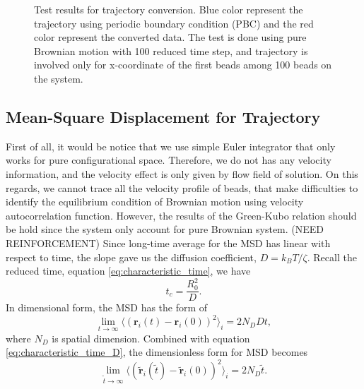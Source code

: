 \documentclass[10pt, a4paper]{article}
\begin{document}
\begin{appendices}
\begin{figure}
\caption{Test results for trajectory conversion. Blue color represent the trajectory using periodic boundary condition (PBC) and the red color represent the converted data. The test is done using pure Brownian motion with 100 reduced time step, and trajectory is involved only for x-coordinate of the first beads among 100 beads on the system.}
\label{fig:traj_conv}
\end{figure}

\subsection{Mean-Square Displacement for Trajectory}
First of all, it would be notice that we use simple Euler integrator that only works for pure configurational space. Therefore, we do not has any velocity information, and the velocity effect is only given by flow field of solution. On this regards, we cannot trace all the velocity profile of beads, that make difficulties to identify the equilibrium condition of Brownian motion using velocity autocorrelation function. However, the results of the Green-Kubo relation should be hold since the system only account for pure Brownian system. (NEED REINFORCEMENT) Since long-time average for the MSD has linear with respect to time, the slope gave us the diffusion coefficient, $D = k_BT/\zeta$. Recall the reduced time, equation \eqref{eq:characteristic_time}, we have
\begin{equation}
t_c = \frac{R_0^2}{D}.\label{eq:characteristic_time_D}
\end{equation}
In dimensional form, the MSD has the form of
\begin{equation}
\lim_{t\to\infty}\langle \left(\mathbf{r}_i(t)- \mathbf{r}_i(0)\right)^2\rangle_i = 2N_D Dt,
\end{equation}
where $N_D$ is spatial dimension.
Combined with equation \eqref{eq:characteristic_time_D}, the dimensionless form for MSD becomes
\begin{equation}
\lim_{\tilde{t}\to\infty}\langle \left(\tilde{\mathbf{r}}_i(\tilde{t})- \tilde{\mathbf{r}}_i(0)\right)^2\rangle_i = 2N_D\tilde{t}.
\end{equation}

\end{appendices}



\printbibliography
\end{document}
